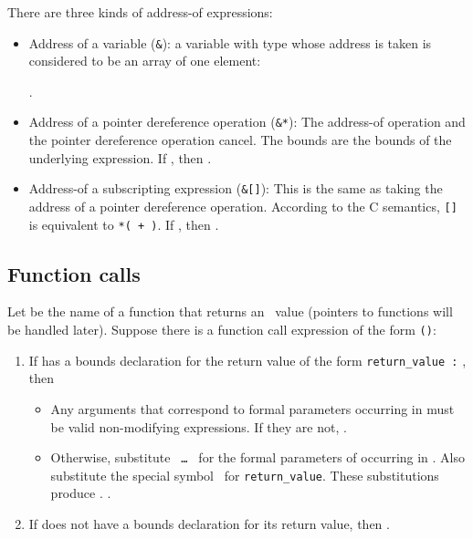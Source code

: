 There are three kinds of address-of expressions:
\begin{itemize}
\item Address of a variable (\texttt{\&}): a variable  with type  
whose address is taken is considered to be an array of one element:

            {}.
            
\item Address of a pointer dereference operation ({\texttt{\&*}}):
The address-of operation and the pointer dereference operation cancel. 
The bounds are the bounds of the underlying expression. 
If , then
.

\item Address-of a subscripting expression (\texttt{\&[]}):
This is the same as taking the address of a pointer dereference operation.
According to the C semantics, \texttt{[]} is equivalent
to \texttt{*( + )}.  If 
, then
.
\end{itemize}
   
\subsection{Function calls}
\label{section:inferring-bounds-for-function-calls}

Let  be the name of a function that returns an
\arrayptr\ value (pointers to functions will be handled later).
Suppose there is a function call expression of the form
\texttt{(}\texttt{)}:

\begin{enumerate}
\item
  If  has a bounds declaration for the return value of the form
  \texttt{return\_value :} , then

  \begin{itemize}
  \item
    Any arguments that correspond to formal parameters occurring in
     must be valid non-modifying expressions. If they are
    not, .
  \item
    Otherwise, substitute \texttt{ \ldots{} } for the formal
    parameters of  occurring in . Also substitute the
    special symbol \exprcurrentvalue\ for
    \texttt{return\_value}. These substitutions produce .
    .
  \end{itemize}
\item
  If  does not have a bounds declaration for its return value,
  then .
\end{enumerate}

